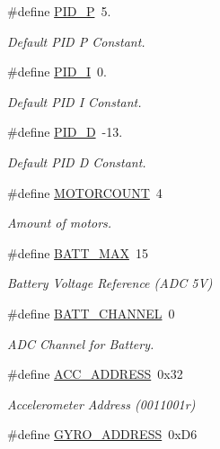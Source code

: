 \begin{DoxyCompactItemize}
\#define \hyperlink{group__config_gab3ea7c9a4399d8844727806c960880ad}{P\-I\-D\-\_\-\-P}~5.
\begin{DoxyCompactList}\small\item\em Default P\-I\-D P Constant. \end{DoxyCompactList}\item 
\#define \hyperlink{group__config_ga2dfd5fcf8dd0bee1de9007fe8e161886}{P\-I\-D\-\_\-\-I}~0.
\begin{DoxyCompactList}\small\item\em Default P\-I\-D I Constant. \end{DoxyCompactList}\item 
\#define \hyperlink{group__config_ga2a442b8579a5c5f9526e824165125497}{P\-I\-D\-\_\-\-D}~-\/13.
\begin{DoxyCompactList}\small\item\em Default P\-I\-D D Constant. \end{DoxyCompactList}\item 
\#define \hyperlink{group__config_ga1a2c496f8bb7dbb5f1dfef5c32624a6d}{M\-O\-T\-O\-R\-C\-O\-U\-N\-T}~4
\begin{DoxyCompactList}\small\item\em Amount of motors. \end{DoxyCompactList}\item 
\#define \hyperlink{group__config_gac873c87f494ea2b22e7eb5fc74ad5a82}{B\-A\-T\-T\-\_\-\-M\-A\-X}~15
\begin{DoxyCompactList}\small\item\em Battery Voltage Reference (A\-D\-C 5\-V) \end{DoxyCompactList}\item 
\#define \hyperlink{group__config_ga9fd748b19523c96052a2964d73a7b0f5}{B\-A\-T\-T\-\_\-\-C\-H\-A\-N\-N\-E\-L}~0
\begin{DoxyCompactList}\small\item\em A\-D\-C Channel for Battery. \end{DoxyCompactList}\item 
\#define \hyperlink{group__config_ga27341a8e1cb1a6ace5a5cf3caea1c99f}{A\-C\-C\-\_\-\-A\-D\-D\-R\-E\-S\-S}~0x32
\begin{DoxyCompactList}\small\item\em Accelerometer Address (0011001r) \end{DoxyCompactList}\item 
\#define \hyperlink{group__config_ga8ed1f343e82440b4ef900e5fe42d74f0}{G\-Y\-R\-O\-\_\-\-A\-D\-D\-R\-E\-S\-S}~0x\-D6

\end{DoxyCompactItemize}
